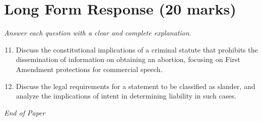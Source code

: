 \documentclass[12pt]{article}
\begin{document}
\section*{Long Form Response (20 marks)}
\textit{Answer each question with a clear and complete explanation.}
\begin{enumerate}[label=\arabic*.]
\setcounter{enumi}{10}
\item Discuss the constitutional implications of a criminal statute that prohibits the dissemination of information on obtaining an abortion, focusing on First Amendment protections for commercial speech.
\item Discuss the legal requirements for a statement to be classified as slander, and analyze the implications of intent in determining liability in such cases.
\end{enumerate}

\vfill
\noindent\textit{End of Paper}
\end{document}
